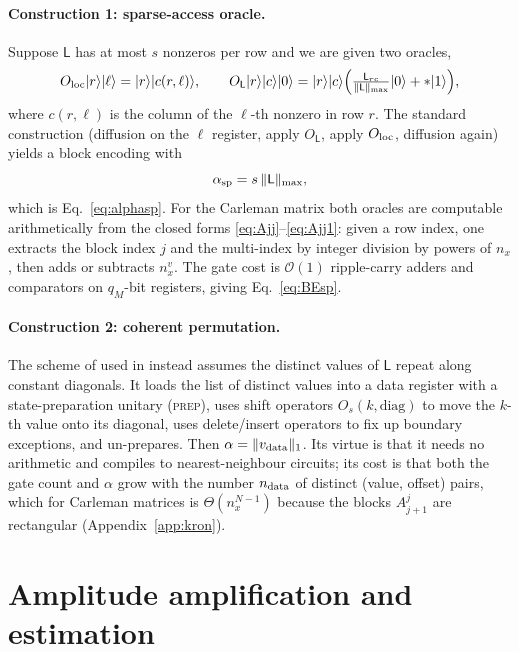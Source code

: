 \documentclass[11pt,a4paper]{article}
\theoremstyle{plain}
\theoremstyle{definition}
\theoremstyle{remark}
\newcommand{\Oh}{\mathcal{O}}
\newcommand{\ket}[1]{\lvert #1 \rangle}
\newcommand{\norm}[1]{\lVert #1 \rVert}
\newcommand{\Lmat}{\mathsf{L}}
\begin{document}
\paragraph{Construction 1: sparse-access oracle.}  Suppose $\Lmat$ has at most
$s$ nonzeros per row and we are given two oracles,
\begin{equation}
O_{\rm loc}\ket{r}\ket{\ell}=\ket{r}\ket{c(r,\ell)},
\qquad
O_{\Lmat}\ket{r}\ket{c}\ket{0}=\ket{r}\ket{c}
\Bigl(\tfrac{\Lmat_{rc}}{\norm{\Lmat}_{\max}}\ket{0}+\ast\ket{1}\Bigr),
\end{equation}
where $c(r,\ell)$ is the column of the $\ell$-th nonzero in row $r$.  The
standard construction (diffusion on the $\ell$ register, apply $O_{\Lmat}$,
apply $O_{\rm loc}$, diffusion again) yields a block encoding with
\begin{equation}
\alpha_{\rm sp}=s\,\norm{\Lmat}_{\max},
\end{equation}
which is Eq.~\eqref{eq:alphasp}.  For the Carleman matrix both oracles are
computable arithmetically from the closed forms
\eqref{eq:Ajj}--\eqref{eq:Ajj1}: given a row index, one extracts the block index
$j$ and the multi-index by integer division by powers of $n_x$, then adds or
subtracts $n_x^{v}$.  The gate cost is $\Oh(1)$ ripple-carry adders and
comparators on $q_M$-bit registers, giving Eq.~\eqref{eq:BEsp}.

\paragraph{Construction 2: coherent permutation.}  The scheme of
\cite{Setty2025BE} used in \cite{Setty2026} instead assumes the distinct values
of $\Lmat$ repeat along constant diagonals.  It loads the list of distinct
values into a data register with a state-preparation unitary (\textsc{prep}),
uses shift operators $O_s(k,\mathrm{diag})$ to move the $k$-th value onto its
diagonal, uses delete/insert operators to fix up boundary exceptions, and
un-prepares.  Then $\alpha=\norm{v_{\rm data}}_1$.  Its virtue is that it needs
no arithmetic and compiles to nearest-neighbour circuits; its cost is that both
the gate count and $\alpha$ grow with the number $n_{\rm data}$ of distinct
(value, offset) pairs, which for Carleman matrices is $\Theta(n_x^{N-1})$
because the blocks $A^j_{j+1}$ are rectangular (Appendix~\ref{app:kron}).

\section{Amplitude amplification and estimation}
\label{app:aa}
\end{document}
